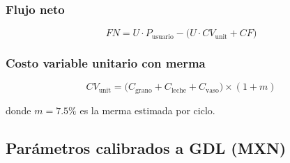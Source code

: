 \documentclass[12pt, a4paper]{article}
\begin{document}
\subsubsection{Flujo neto}

\begin{equation}
  FN = U \cdot P_{\text{usuario}} - \bigl(U \cdot CV_{\text{unit}} + CF\bigr)
\end{equation}

\subsubsection{Costo variable unitario con merma}

\begin{equation}
  CV_{\text{unit}} = \bigl(C_{\text{grano}} + C_{\text{leche}} + C_{\text{vaso}}\bigr) \times (1 + m)
\end{equation}

donde $m = 7.5\%$ es la merma estimada por ciclo.

\subsection{Parámetros calibrados a GDL (MXN)}
\end{document}
